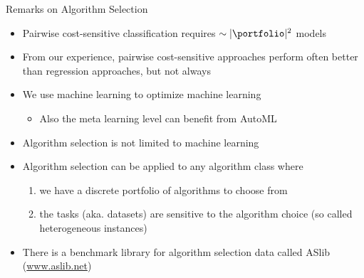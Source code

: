 \begin{frame}[c]{Remarks on Algorithm Selection}

\begin{itemize}
	\item Pairwise cost-sensitive classification requires $\sim |\portfolio|^2$ models
	\pause
	\item From our experience, pairwise cost-sensitive approaches perform often better than regression approaches, but not always
	\pause
	\item We use machine learning to optimize machine learning
	\begin{itemize}
		\item Also the meta learning level can benefit from AutoML\\ 
	\end{itemize}
	\pause
	\item Algorithm selection is not limited to machine learning
	\item Algorithm selection can be applied to any algorithm class where 
	\begin{enumerate}
		\item we have a discrete portfolio of algorithms to choose from
		\item the tasks (aka. datasets) are sensitive to the algorithm choice (so called heterogeneous instances)
	\end{enumerate}
	\pause
	\item There is a benchmark library for algorithm selection data called ASlib (\url{www.aslib.net}) 
\end{itemize}

\end{frame}
